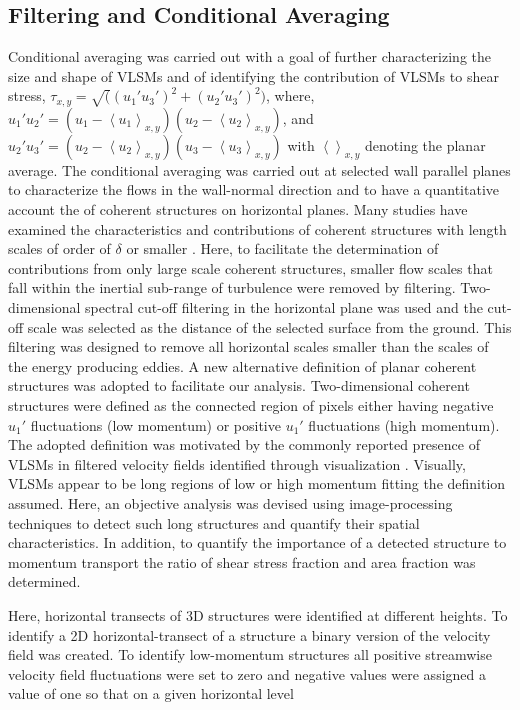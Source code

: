 \documentclass{amsart}
\begin{document}
\subsection{Filtering and Conditional Averaging}
Conditional averaging was carried out with a goal of further characterizing the size and shape of VLSMs and of identifying the contribution of VLSMs to shear stress, $\tau_{x,y} = \sqrt((u_{1}'u_{3}')^2+(u_{2}'u_{3}')^2)$, where, $u_{1}'u_{2}'= (u_{1} -\left< u_{1}\right >_{x,y})(u_{2} -\left< u_{2}\right >_{x,y})$, and $u_{2}'u_{3}'= (u_2 -\left< u_{2}\right >_{x,y})(u_{3} -\left< u_{3}\right >_{x,y})$ with $\left < \right >_{x,y}$ denoting the planar average. The conditional averaging was carried out at selected wall parallel planes to characterize the flows in the wall-normal direction and to have a quantitative account the of coherent structures on horizontal planes. Many studies have examined  the characteristics and contributions of coherent structures with length scales of order of $\delta$ or smaller \citep{}. Here, to facilitate the determination of contributions from only large scale coherent structures, smaller flow scales that  fall within the inertial sub-range of turbulence were removed by filtering.  Two-dimensional spectral cut-off filtering in the horizontal plane was used and the cut-off scale was selected as the distance of the selected surface from the ground. This filtering was designed to remove all horizontal scales smaller than the scales  of the energy producing eddies.  A new alternative definition of planar coherent structures was adopted to facilitate our analysis. Two-dimensional coherent structures were defined as the connected region of pixels either having negative $u_{1}'$ fluctuations (low momentum) or positive $u_{1}'$ fluctuations (high momentum). The adopted definition was motivated by the commonly reported presence of VLSMs in filtered velocity fields identified through visualization \citep{hutchins_marusic_jfm2007,dennis_nickels_jfm2011}.  Visually, VLSMs appear to be long regions of low or high momentum fitting the definition assumed.  Here, an objective analysis was devised using image-processing techniques to detect such long structures and quantify their spatial characteristics. In addition, to quantify the importance of a detected structure to momentum transport the ratio of shear stress fraction and area fraction was determined.  

Here, horizontal transects of 3D structures were identified at different heights. To identify a 2D horizontal-transect of a structure a binary version of the velocity field was created. To identify low-momentum structures all positive streamwise velocity field fluctuations were set to zero and negative values were assigned a value of one so that on a given horizontal level 
\end{document}
